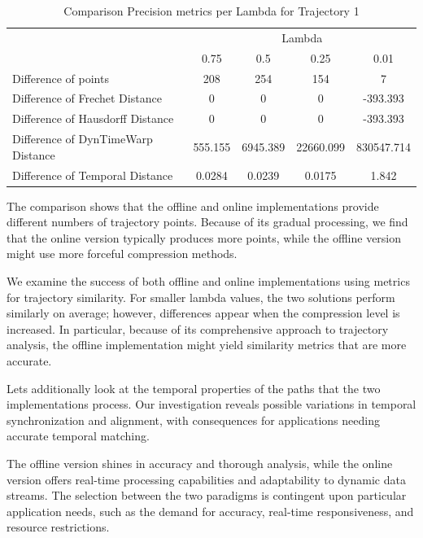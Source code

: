 \begin{table}[htbp]
\centering
\label{tab:precision_metrics_c}
\begin{tabular}{@{}lcccc@{}}
\toprule
& \multicolumn{4}{c}{Lambda} \\
\cmidrule{2-5}
& 0.75       & 0.5        & 0.25       & 0.01       \\
\midrule
Difference of points           & 208 & 254 & 154 & 7 \\
Difference of Frechet Distance              & 0 & 0 & 0 & -393.393 \\
Difference of Hausdorff Distance             & 0 & 0 & 0 & -393.393 \\
Difference of DynTimeWarp Distance            & 555.155 & 6945.389 & 22660.099 & 830547.714\\
Difference of Temporal Distance            & 0.0284 & 0.0239 & 0.0175 & 1.842\\
\bottomrule
\end{tabular}
\caption{Comparison Precision metrics per Lambda for Trajectory 1 }
\end{table}

The comparison shows that the offline and online implementations provide different numbers of trajectory points. Because of its gradual processing, we find that the online version typically produces more points, while the offline version might use more forceful compression methods.

We examine the success of both offline and online implementations using metrics for trajectory similarity. For smaller lambda values, the two solutions perform similarly on average; however, differences appear when the compression level is increased. In particular, because of its comprehensive approach to trajectory analysis, the offline implementation might yield similarity metrics that are more accurate.

Lets additionally look at the temporal properties of the paths that the two implementations process. Our investigation reveals possible variations in temporal synchronization and alignment, with consequences for applications needing accurate temporal matching.

The offline version shines in accuracy and thorough analysis, while the online version offers real-time processing capabilities and adaptability to dynamic data streams. The selection between the two paradigms is contingent upon particular application needs, such as the demand for accuracy, real-time responsiveness, and resource restrictions.




